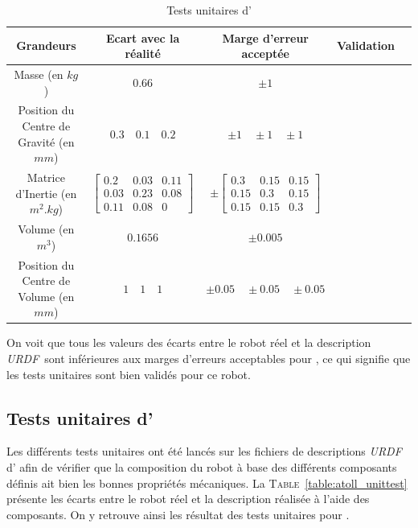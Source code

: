 			\begin{table}[!htb]
				\centering
				\begin{adjustbox}{max width=\textwidth}
					\begin{tabular}{|c|c|c|c|c|}
						\hline
						\textbf{Grandeurs} & \textbf{Ecart avec la réalité} & \textbf{Marge d'erreur acceptée} & \textbf{Validation} \\
						\hline
						Masse (en $kg$) & $0.66$ & $\pm 1$ & \cmark \\
						\hline
						Position du Centre de Gravité (en $mm$) & $0.3 \quad 0.1 \quad 0.2$ & $\pm 1 \quad \pm 1 \quad \pm 1$ & \cmark \\
						\hline
						Matrice d'Inertie (en $m^2.kg$) & $\begin{bmatrix}0.2 & 0.03 & 0.11 \\ 0.03 & 0.23 & 0.08 \\ 0.11 & 0.08 & 0\end{bmatrix}$ & $\pm \begin{bmatrix}0.3 & 0.15 & 0.15 \\ 0.15 & 0.3 & 0.15 \\ 0.15 & 0.15 & 0.3\end{bmatrix}$ & \cmark \\
						\hline
						Volume (en $m^3$) & $0.1656$ & $\pm 0.005$ & \cmark \\
						\hline
						Position du Centre de Volume (en $mm$) & $1 \quad 1 \quad 1$ & $\pm 0.05 \quad \pm 0.05 \quad \pm 0.05$ & \cmark \\
						\hline
					\end{tabular}
				\end{adjustbox}
				\caption{Tests unitaires d'\argos{}}
				\label{table:argos_unittest}
			\end{table}

			On voit que tous les valeurs des écarts entre le robot réel et la description \textit{URDF} sont inférieures aux marges d'erreurs acceptables pour \argos{}, ce qui signifie que les tests unitaires sont bien validés pour ce robot.

		\subsection{Tests unitaires d'\atoll{}}

			Les différents tests unitaires ont été lancés sur les fichiers de descriptions \textit{URDF} d'\atoll{} afin de vérifier que la composition du robot à base des différents composants définis ait bien les bonnes propriétés mécaniques. La \textsc{Table}~\ref{table:atoll_unittest} présente les écarts entre le robot réel et la description réalisée à l'aide des composants. On y retrouve ainsi les résultat des tests unitaires pour \atoll{}.
			
